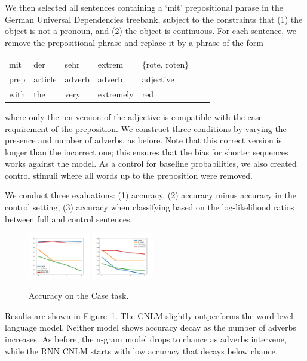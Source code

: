We then selected all sentences containing a `mit' prepositional phrase in the German Universal Dependencies treebank, subject to the constraints that (1) the object is not a pronoun, and (2) the object is continuous.
For each sentence, we remove the prepositional phrase and replace it by a phrase of the form
\begin{tabular}{lllllll}
	mit & der & sehr& extrem& \{rote, roten\} \\
	prep & article & adverb & adverb & adjective \\
	with & the & very & extremely & red 
\end{tabular}
where only the -en version of the adjective is compatible with the case requirement of the preposition.
We construct three conditions by varying the presence and number of adverbs, as before.
Note that this correct version is longer than the incorrect one; this ensures that the bias for shorter sequences works against the model.
As a control for baseline probabilities, we also created control stimuli where all words up to the preposition were removed.


We conduct three evaluations: (1) accuracy, (2) accuracy minus accuracy in the control setting, (3) accuracy when classifying based on the log-likelihood ratios between full and control sentences.

\begin{figure}
\includegraphics[width=0.24\textwidth]{figures/german-prep-Accuracy.pdf}
\includegraphics[width=0.24\textwidth]{figures/german-prep-Control.pdf}
\caption{Accuracy on the Case task.}\label{fig:prep}
\end{figure}

Results are shown in Figure~\ref{fig:prep}.
The CNLM slightly outperforms the word-level language model.
Neither model shows accuracy decay as the number of adverbs increases.
As before, the n-gram model drops to chance as adverbs intervene, while the RNN CNLM starts with low accuracy that decays below chance.



